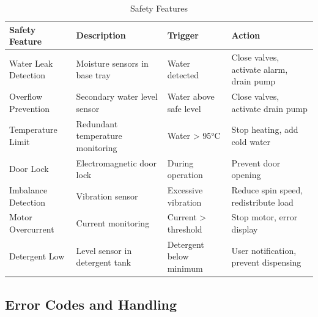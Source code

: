 \begin{table}[H]
\centering
\caption{Safety Features}
\label{tab:safety}
\small
\begin{tabular}{|l|p{3.2cm}|p{3.2cm}|p{3.8cm}|}
\hline
\textbf{Safety Feature} & \textbf{Description} & \textbf{Trigger} & \textbf{Action} \\
\hline
Water Leak Detection & Moisture sensors in base tray & Water detected & Close valves, activate alarm, drain pump \\
\hline
Overflow Prevention & Secondary water level sensor & Water above safe level & Close valves, activate drain pump \\
\hline
Temperature Limit & Redundant temperature monitoring & Water > 95°C & Stop heating, add cold water \\
\hline
Door Lock & Electromagnetic door lock & During operation & Prevent door opening \\
\hline
Imbalance Detection & Vibration sensor & Excessive vibration & Reduce spin speed, redistribute load \\
\hline
Motor Overcurrent & Current monitoring & Current > threshold & Stop motor, error display \\
\hline
Detergent Low & Level sensor in detergent tank & Detergent below minimum & User notification, prevent dispensing \\
\hline
\end{tabular}
\end{table}

\subsection{Error Codes and Handling}

